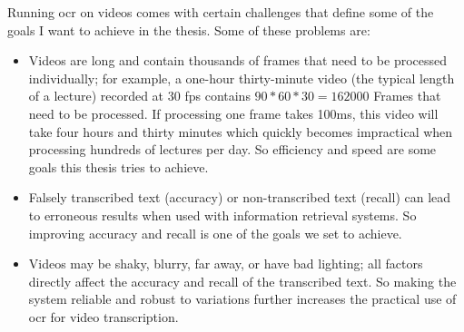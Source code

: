 Running \gls{ocr} on videos comes with certain challenges that define some of the goals I want to achieve in the thesis. Some of these problems are:
\begin{itemize}
    \item Videos are long and contain thousands of frames that need to be processed individually; for example, a one-hour thirty-minute video (the typical length of a lecture) recorded at 30 \gls{fps} contains $90 * 60 * 30 = 162000$ Frames that need to be processed. If processing one frame takes 100ms, this video will take four hours and thirty minutes which quickly becomes impractical when processing hundreds of lectures per day.
    So efficiency and speed are some goals this thesis tries to achieve.
    \item Falsely transcribed text (accuracy) or non-transcribed text (recall) can lead to erroneous results when used with information retrieval systems. So improving accuracy and recall is one of the goals we set to achieve.
    \item Videos may be shaky, blurry, far away, or have bad lighting; all factors directly affect the accuracy and recall of the transcribed text. So making the system reliable and robust to variations further increases the practical use of \gls{ocr} for video transcription.
\end{itemize}